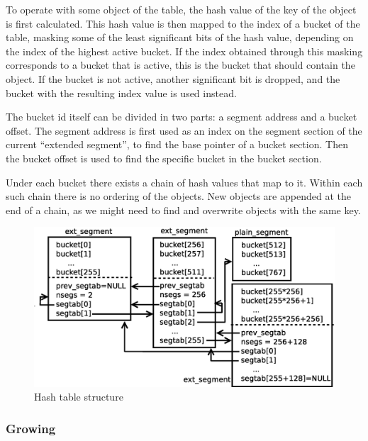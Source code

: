 \documentclass[aps,pre,preprint,nofootinbib]{revtex4}
\begin{document}
To operate with some object of the table, the hash value of the key of the object is first calculated.
This hash value is then mapped to the index of a bucket of the table, masking some of the least significant bits of the hash value, depending on the index of the highest active bucket.
If the index obtained through this masking corresponds to a bucket that is active, this is the bucket that should contain the object.
If the bucket is not active, another significant bit is dropped, and the bucket with the resulting index value is used instead.

The bucket id itself can be divided in two parts: a segment address and a bucket offset.
The segment address is first used as an index on the segment section of the current ``extended segment'', to find the base pointer of a bucket section.
Then the bucket offset is used to find the specific bucket in the bucket section.

Under each bucket there exists a chain of hash values that map to it.
Within each such chain there is no ordering of the objects.
New objects are appended at the end of a chain, as we might need to find and overwrite objects with the same key.

\begin{figure}[htb]
\centering
\includegraphics[width=1.0\textwidth]{hash_table_structure.eps}
\caption{Hash table structure} 
\label{fig:hash_table_structure}
\end{figure}

\subsubsection{Growing}
\end{document}
